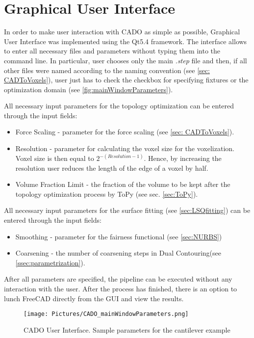 \section{Graphical User Interface}
\label{sec:gui}
In order to make user interaction with CADO as simple as possible, Graphical User Interface was implemented using the Qt5.4 \cite{Qt} framework. 
The interface allows to enter all necessary files and parameters without typing them into the command line. In particular, user chooses only the main \textit{.step} file and then, if all other files were named according to the naming convention (see \autoref{sec: CADToVoxels}), user just has to check the checkbox for specifying fixtures or the optimization domain (see \autoref{fig:mainWindowParameters}).

All necessary input parameters for the topology optimization can be entered through the input fields:
\begin{itemize}
\item Force Scaling - parameter for the force scaling (see \autoref{sec: CADToVoxels}).
\item Resolution - parameter for calculating the voxel size for the voxelization. Voxel size is then equal to $2^{-(Resolution - 1)}$. Hence, by increasing the resolution user reduces the length of the edge of a voxel by half.
\item Volume Fraction Limit - the fraction of the volume to be kept after the topology optimization process by ToPy (see sec. \ref{sec:ToPy}).

\end{itemize}
All necessary input parameters for the surface fitting (see \autoref{sec:LSQfitting}) can be entered through the input fields:
\begin{itemize}
\item Smoothing - parameter for the fairness functional (see \autoref{sec:NURBS})
\item Coarsening - the number of coarsening steps in Dual Contouring(see \autoref{ssec:parametrization}).
\end{itemize}

After all parameters are specified, the pipeline can  be executed without any interaction with the user. After the process has finished, there is an option to lunch FreeCAD directly from the GUI  and view the results.

\begin{figure}[h]
\centering
\texttt{[image: Pictures/CADO\_mainWindowParameters.png]}
\caption{CADO User Interface. Sample parameters for the cantilever example}
\label{fig:mainWindowParameters}
\end{figure}
